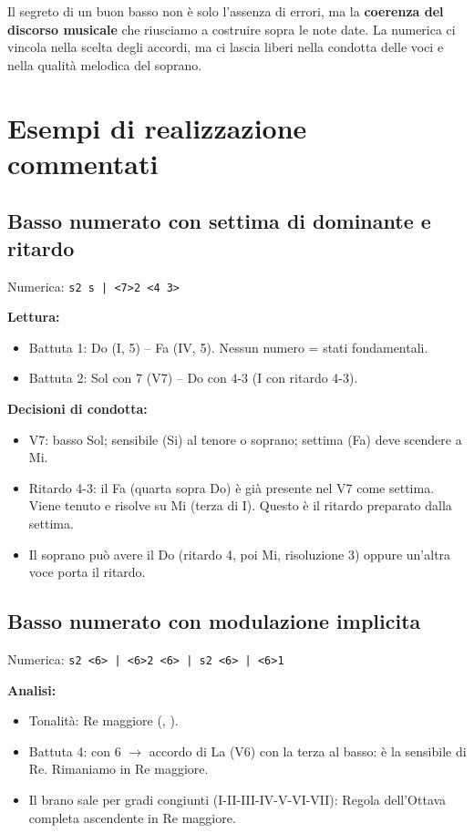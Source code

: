 Il segreto di un buon basso non è solo l'assenza di errori, ma la \textbf{coerenza del discorso musicale} che riusciamo a costruire sopra le note date. La numerica ci vincola nella scelta degli accordi, ma ci lascia liberi nella condotta delle voci e nella qualità melodica del soprano.

\section{Esempi di realizzazione commentati}
\label{sec:esempi_realizzazione}

\subsection{Basso numerato con settima di dominante e ritardo}

Numerica: \texttt{s2 s | <7>2 <4 3>}

\textbf{Lettura:}
\begin{itemize}
	\item Battuta 1: Do (I, 5) -- Fa (IV, 5). Nessun numero = stati fondamentali.
	\item Battuta 2: Sol con 7 (V7) -- Do con 4-3 (I con ritardo 4-3).
\end{itemize}

\textbf{Decisioni di condotta:}
\begin{itemize}
	\item V7: basso Sol; sensibile (Si) al tenore o soprano; settima (Fa) deve scendere a Mi.
	\item Ritardo 4-3: il Fa (quarta sopra Do) è già presente nel V7 come settima. Viene tenuto e risolve su Mi (terza di I). Questo è il ritardo preparato dalla settima.
	\item Il soprano può avere il Do (ritardo 4, poi Mi, risoluzione 3) oppure un'altra voce porta il ritardo.
\end{itemize}


\subsection{Basso numerato con modulazione implicita}

Numerica: \texttt{s2 <6> | <6>2 <6> | s2 <6> | <6>1}

\textbf{Analisi:}
\begin{itemize}
	\item Tonalità: Re maggiore (\Fadiesis{}, \Dodiesis{}).
	\item Battuta 4: \Dodiesis{} con 6 $\rightarrow$ accordo di La (V6) con la terza al basso: \Dodiesis{} è la sensibile di Re. Rimaniamo in Re maggiore.
	\item Il brano sale per gradi congiunti (I-II-III-IV-V-VI-VII): Regola dell'Ottava completa ascendente in Re maggiore.
\end{itemize}

